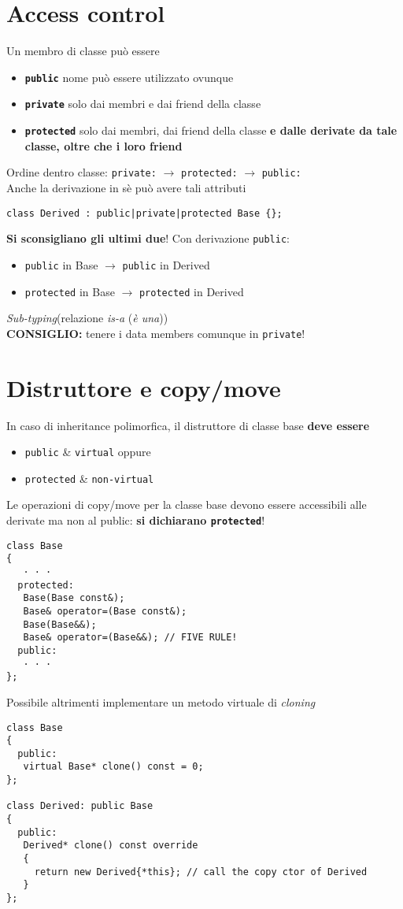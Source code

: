 \documentclass[10pt, oneside]{Book}
\begin{document}
\section{Access control}
Un membro di classe può essere
\begin{itemize}
\item \textbf{\texttt{public}} nome può essere utilizzato ovunque
\item \textbf{\texttt{private}} solo dai membri e dai friend della classe
\item \textbf{\texttt{protected}} solo dai membri, dai friend della classe \textbf{e dalle derivate da tale classe, oltre che i loro friend}
\end{itemize}
Ordine dentro classe: \texttt{private:} $\rightarrow$ \texttt{protected:} $\rightarrow$ \texttt{public:}
\\Anche la derivazione in sè può avere tali attributi
\begin{verbatim}
class Derived : public|private|protected Base {};
\end{verbatim}
\textbf{Si sconsigliano gli ultimi due}! Con derivazione \texttt{public}:
\begin{itemize}
\item \texttt{public} in Base $\rightarrow$ \texttt{public} in Derived
\item \texttt{protected} in Base $\rightarrow$ \texttt{protected} in Derived
\end{itemize}
\textit{Sub-typing}(relazione \textit{is-a} (\textit{è una}))
\\\textbf{CONSIGLIO:} tenere i data members comunque in \texttt{private}!

\section{Distruttore e copy/move}
In caso di inheritance polimorfica, il distruttore di classe base \textbf{deve essere}
\begin{itemize}
\item \texttt{public} \& \texttt{virtual} oppure
\item \texttt{protected} \& \texttt{non-virtual}
\end{itemize}
Le operazioni di copy/move per la classe base devono essere accessibili alle derivate ma non al public: \textbf{si dichiarano \texttt{protected}}!
\begin{verbatim}
class Base
{
   · · · 
  protected:
   Base(Base const&);
   Base& operator=(Base const&);
   Base(Base&&);
   Base& operator=(Base&&); // FIVE RULE!
  public:
   · · · 
};
\end{verbatim}
Possibile altrimenti implementare un metodo virtuale di \textit{cloning}
\begin{verbatim}
class Base
{
  public:
   virtual Base* clone() const = 0;
};

class Derived: public Base
{
  public:
   Derived* clone() const override
   {
     return new Derived{*this}; // call the copy ctor of Derived
   }
};
\end{verbatim}
\end{document}
